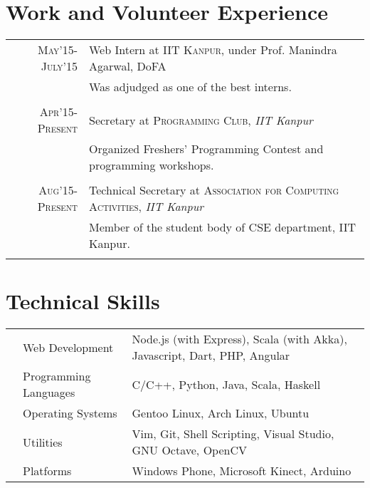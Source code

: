 \documentclass[11pt,a4paper]{article}
\begin{document}
\vspace{-0.6cm}
\section*{Work and Volunteer Experience}
\vspace{-0.2cm}
\bgroup
\def\arraystretch{0.6}
\begin{tabular}{r|p{20cm}}
\textsc{May'15-July'15} & Web Intern at \textsc{IIT Kanpur}, under Prof. Manindra Agarwal, DoFA\\
                        &\footnotesize{Was adjudged as one of the best interns.}\\\multicolumn{2}{c}{} \\
\textsc{Apr'15-Present} & Secretary at \textsc{Programming Club}, \emph{IIT Kanpur}\\
&\footnotesize{Organized Freshers' Programming Contest and programming workshops.}\\\multicolumn{2}{c}{} \\

\textsc{Aug'15-Present} & Technical Secretary at \textsc{Association for Computing Activities}, \emph{IIT Kanpur}\\
&\footnotesize{Member of the student body of CSE department, IIT Kanpur.}\\\multicolumn{2}{c}{} \\

\end{tabular}
\egroup

\vspace{-0.6cm}
\section*{Technical Skills}
\vspace{-0.2cm}
\begin{tabular}{L{0.05cm} L{5cm} l}
  &Web Development 	        &Node.js (with Express), Scala (with Akka), Javascript, Dart, PHP, Angular\\
&Programming Languages      &C/C++, Python, Java, Scala, Haskell\\
&Operating Systems	        &Gentoo Linux, Arch Linux, Ubuntu\\
&Utilities                  &Vim, Git, Shell Scripting, Visual Studio, GNU Octave, OpenCV\\
&Platforms                  &Windows Phone, Microsoft Kinect, Arduino\\

\end{tabular}
\end{document}
